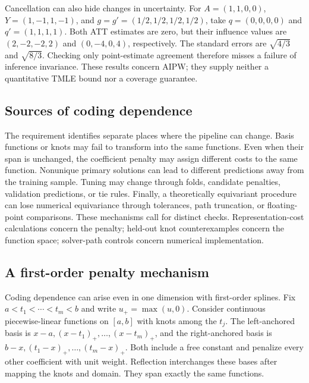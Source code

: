 \documentclass[11pt]{article}
\theoremstyle{definition}
\theoremstyle{remark}
\begin{document}
Cancellation can also hide changes in uncertainty. For
$A=(1,1,0,0)$, $Y=(1,-1,1,-1)$, and $g=g'=(1/2,1/2,1/2,1/2)$,
take $q=(0,0,0,0)$ and $q'=(1,1,1,1)$. Both ATT estimates are zero, but
their influence values are $(2,-2,-2,2)$ and $(0,-4,0,4)$, respectively.
The standard errors are $\sqrt{4/3}$ and $\sqrt{8/3}$. Checking only
point-estimate agreement therefore misses a failure of inference invariance.
These results concern AIPW; they supply neither a quantitative TMLE bound
nor a coverage guarantee.

\subsection{Sources of coding dependence}

The requirement identifies separate places where the pipeline can change.
Basis functions or knots may fail to transform into the same functions.
Even when their span is unchanged, the coefficient penalty may assign
different costs to the same function. Nonunique primary solutions can lead
to different predictions away from the training sample. Tuning may change
through folds, candidate penalties, validation predictions, or tie rules.
Finally, a theoretically equivariant procedure can lose numerical
equivariance through tolerances, path truncation, or floating-point
comparisons. These mechanisms call for distinct checks. Representation-cost
calculations concern the penalty; held-out knot counterexamples concern
the function space; solver-path controls concern numerical implementation.

\subsection{A first-order penalty mechanism}\label{sec:firstorder-penalty}

Coding dependence can arise even in one dimension with first-order splines.
Fix $a<t_1<\cdots<t_m<b$ and write $u_+=\max(u,0)$. Consider continuous
piecewise-linear functions on $[a,b]$ with knots among the $t_j$. The
left-anchored basis is $x-a,(x-t_1)_+,\ldots,(x-t_m)_+$, and the
right-anchored basis is $b-x,(t_1-x)_+,\ldots,(t_m-x)_+$. Both include a
free constant and penalize every other coefficient with unit weight.
Reflection interchanges these bases after mapping the knots and domain.
They span exactly the same functions.
\end{document}
